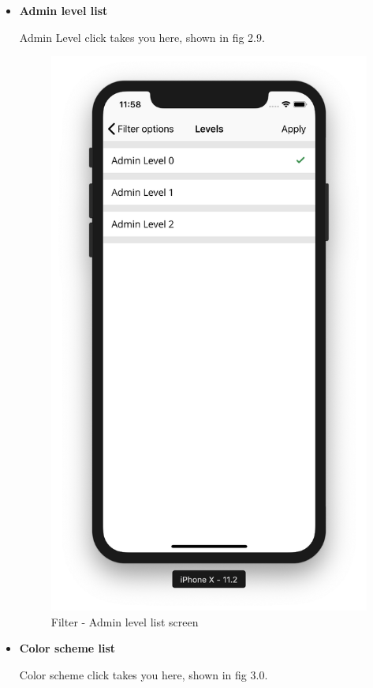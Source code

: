 \begin{itemize}
\begin{itemize}
    \newpage
        
        \item \textbf{Admin level list}
        
        Admin Level click takes you here, shown in fig 2.9.
        
         \begin{figure}[H]
            \centering
            \includegraphics[width=0.5\linewidth]{figures/ch2/level_list.png}
            \caption{\label{fig:level_list_screen} Filter - Admin level list screen}
        \end{figure}
    
    \newpage
    
     \item \textbf{Color scheme list}
     
     Color scheme click takes you here, shown in fig 3.0.
        

\end{itemize}
\end{itemize}
